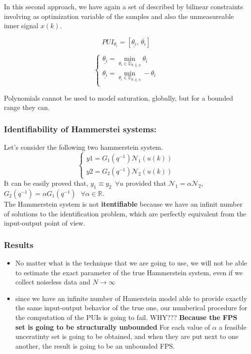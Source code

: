 In this second approach, we have again a set of described by bilinear constraints involving as optimization variable of the samples and also the unmeasureable inner signal $x(k)$.

\[
PUI_{\theta_i} = [\underline{\theta_i},\,\overline{\theta_i}]
\]

\[
\begin{cases}
\underline{\theta_i} = \min \limits_{\theta_i \in \mathbb{\mathbb{D}_{\theta,\,\xi,\,\eta}}} \theta_i\\
\underline{\theta_i} = \min \limits_{\theta_i \in \mathbb{\mathbb{D}_{\theta,\,\xi,\,\eta}}} -\theta_i\\
\end{cases}
\]
\begin{QandAbox}
Polynomials cannot be used to model saturation, globally, but for a bounded range they can. 
\end{QandAbox}

\subsubsection{Identifiability of Hammerstei systems:}
Let's consider the following two hammerstein system.
\[
\begin{cases}
y1 = G_1(q^{-1})\mathcal{N}_1(u(k))\\
y2 = G_2(q^{-1})\mathcal{N}_2(u(k))
\end{cases}
\]
It can be easily proved that, $y_1 \equiv y_2\,\,\,\forall u$ provided that $\mathcal{N}_1 = \alpha \mathcal{N}_2$, $G_2(q^{-1}) = \alpha G_1(q^{-1}) \:\:\:\forall \alpha \in \mathbb{R}$.\\

The Hammerstein system is not \textbf{itentifiable} because we have an infinit number of solutions to the identification problem, which are perfectly equivalent from the input-output point of view.\\

\subsubsection{Results}
\begin{itemize}
    \item No matter what is the technique that we are going to use, we will not be able to estimate the exact parameter of the true Hammerstein system, even if we collect noiseless data and $N \to \infty$
    \item since we have an infinite number of Hamerstein model able to provide exactly the same input-output behavior of the true one, our numberical procedure for the computation of the PUIs is going to fail. WHY???  \textbf{Because the FPS set is going to be structurally unbounded} For each value of $\alpha$ a feasible unceratinty set is going to be obtained, and when they are put next to one another, the result is going to be an unbounded FPS.
\end{itemize}

